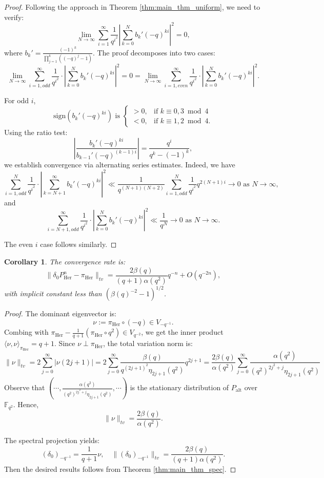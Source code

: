 \documentclass[a4]{amsart}
\newcommand{\alt}{{\mathrm{alt}}}
\newcommand{\her}{{\mathrm{Her}}}
\newcommand{\sign}{{\mathrm{sign}}}
\newcommand{\BF}{{\mathbb {F}}}
\newcommand{\ra}{\rightarrow}
\newtheorem{corollary}[theorem]{Corollary}
\theoremstyle{remark} \newtheorem{remark}[theorem]{Remark}
\begin{document}
\begin{proof}
Following the approach in Theorem \ref{thm:main_thm_uniform}, we need to verify:
\[
\lim_{N\to\infty} \sum_{i=1}^\infty \frac{1}{q^{i^2}} \left|\sum_{k=0}^N b_k' (-q)^{ki}\right|^2 = 0,
\]
where $b_k' = \frac{(-1)^k}{\prod_{j=1}^k ((-q)^j - 1)}$. 
The proof decomposes into two cases:
\[\lim_{N\ra \infty}\sum_{i=1, odd}^{\infty}\frac{1}{q^{i^2}}\cdot \left|\sum_{k=0}^{N}b_k'(-q)^{ki}\right|^2=0=\lim_{N\ra \infty}\sum_{i=1, even}^{\infty}\frac{1}{q^{i^2}}\cdot \left|\sum_{k=0}^{N}b_k'(-q)^{ki}\right|^2.\]

For odd $i$,   
\[\sign(b_k'(-q)^{ki})\text{ is }
\begin{cases}
    >0, & \mbox{if } k\equiv 0,3\bmod 4 \\
    <0, & \mbox{if } k\equiv 1,2\bmod 4.
   \end{cases} \]
Using the ratio test:
\[
\left|\frac{b_{k}'(-q)^{ki}}{b_{k-1}'(-q)^{(k-1)i}}\right| = \frac{q^i}{q^k - (-1)^k},
\]
we establish convergence via alternating series estimates. Indeed,
we have
\[\sum_{i=1, odd}^{N} \frac{1}{q^{i^2}}\cdot \left|\sum_{k=N+1}^{\infty}b_k'(-q)^{ki}\right|^2   \ll \frac{1}{q^{(N+1)(N+2)}} \sum_{i=1, odd}^{N}\frac{1}{q^{i^2}} q^{2(N+1)i}\ra 0 \text{ as } N\ra \infty,\]
and
\[\sum_{i=N+1,odd}^{\infty}\frac{1}{q^{i^2}}\cdot \left|\sum_{k=0}^{N}b_k'(-q)^{ki}\right|^2  \ll \frac{1}{q^N}\ra 0 \text{ as } N\ra \infty.\]



The even $i$ case follows similarly.

\end{proof}

\begin{corollary}\label{cor:her_converg}
The convergence rate is:
\[
\|\delta_0 P_\her^n - \pi_\her\|_{tv} = \frac{2\beta(q)}{(q+1)\alpha(q^2)} q^{-n} + O(q^{-2n}),
\]
with implicit constant less than $ ( \beta(q)^{-2}-1)^{1/2}$.
\end{corollary}

\begin{proof}
The dominant eigenvector is:
\[
\nu := \pi_\her \circ (-q) \in V_{-q^{-1}}.
\]
Combing with $\pi_\her-\frac{1}{q+1}(\pi_\her\circ q^2)\in V_{q^{-2}}$, we get the inner product $\langle \nu, \nu \rangle_{\pi_\her} = q+1$.
Since $\nu \perp \pi_\her$,  the total variation norm is:
\[\|\nu\|_{tv} = 2\sum_{j=0}^{\infty}|\nu(2j+1)|=2\sum_{j=0}^{\infty} \frac{\beta(q)}{q^{(2j+1)^2} \eta_{2j+1}(q^2)}q^{2j+1}=\frac{2\beta(q)}{\alpha(q^2)}\sum_{j=0}^{\infty}\frac{\alpha(q^2)}{(q^2)^{2j^2+j}\eta_{2j+1}(q^2)} \]
Observe that $\left(\cdots,\frac{\alpha(q^2)}{(q^2)^{2j^2+j}\eta_{2j+1}(q^2)},\cdots\right)$ is the stationary distribution of $P_{\alt}$ over $\BF_{q^2}$.
Hence,
\[\|\nu\|_{tv}=\frac{2\beta(q)}{\alpha(q^2)}.\] 



The spectral projection yields:
\[
(\delta_0)_{-q^{-1}} = \frac{1}{q+1} \nu, \quad \|(\delta_0)_{-q^{-1}}\|_{tv} = \frac{2\beta(q)}{(q+1)\alpha(q^2)}.
\]
Then the desired results follows from Theorem \ref{thm:main_thm_spec}.
\end{proof}
\end{document}
